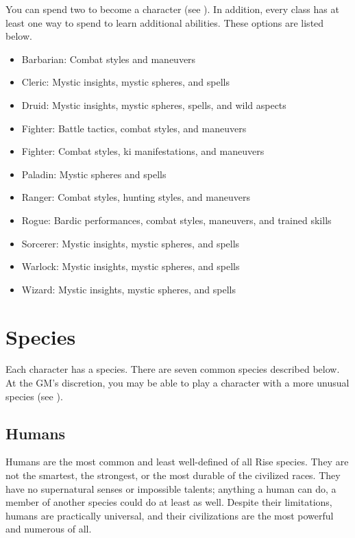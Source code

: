     You can spend two  to become a  character (see ).
    In addition, every class has at least one way to spend  to learn additional abilities.
    These options are listed below.
    \begin{itemize}
        \item Barbarian: Combat styles and maneuvers
        \item Cleric: Mystic insights, mystic spheres, and spells
        \item Druid: Mystic insights, mystic spheres, spells, and wild aspects
        \item Fighter: Battle tactics, combat styles, and maneuvers
        \item Fighter: Combat styles, ki manifestations, and maneuvers
        \item Paladin: Mystic spheres and spells
        \item Ranger: Combat styles, hunting styles, and maneuvers
        \item Rogue: Bardic performances, combat styles, maneuvers, and trained skills
        \item Sorcerer: Mystic insights, mystic spheres, and spells
        \item Warlock: Mystic insights, mystic spheres, and spells
        \item Wizard: Mystic insights, mystic spheres, and spells
    \end{itemize}

\section{Species}\label{Species}
    Each character has a species.
    There are seven common species described below.
    At the GM's discretion, you may be able to play a character with a more unusual species (see ).

    \subsection{Humans}

        Humans are the most common and least well-defined of all Rise species.
        They are not the smartest, the strongest, or the most durable of the civilized races.
        They have no supernatural senses or impossible talents; anything a human can do, a member of another species could do at least as well.
        Despite their limitations, humans are practically universal, and their civilizations are the most powerful and numerous of all.

